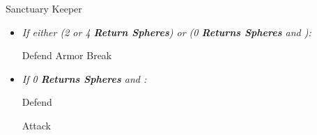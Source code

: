 \begin{battle}[40000]{Sanctuary Keeper}
	\begin{itemize}
		\item \textit{If either (2 or 4 \textbf{Return Spheres}) or (0 \textbf{Returns Spheres} and \blitzloss):}
		      \begin{itemize}
			      \yunaf Defend
			      \tidusf Armor Break
		      \end{itemize}
		\item \textit{If 0 \textbf{Returns Spheres} and \blitzwin:}
		      \begin{itemize}
			      \tidusf Defend
		      \end{itemize}
		      \summon{\bahamut}
		      \bahamutf Attack
	\end{itemize}
\end{battle}
\newpage